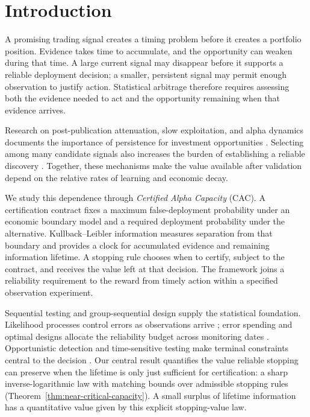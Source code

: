 \documentclass[11pt]{article}
\numberwithin{equation}{section}
\theoremstyle{plain}
\theoremstyle{definition}
\theoremstyle{remark}
\begin{document}
\vspace{0.45em}

\section{Introduction}\label{introduction}

A promising trading signal creates a timing problem before it creates a portfolio position. Evidence takes time to accumulate, and the opportunity can weaken during that time. A large current signal may disappear before it supports a reliable deployment decision; a smaller, persistent signal may permit enough observation to justify action. Statistical arbitrage therefore requires assessing both the evidence needed to act and the opportunity remaining when that evidence arrives.

Research on post-publication attenuation, slow exploitation, and alpha dynamics documents the importance of persistence for investment opportunities \cite{mcleanpontiff2016,jacobsmuller2020,kaplanski2023,penasse2022}. Selecting among many candidate signals also increases the burden of establishing a reliable discovery \cite{harveyliu2016,baileyloprado2014,baileyborwein2017}. Together, these mechanisms make the value available after validation depend on the relative rates of learning and economic decay.

We study this dependence through \emph{Certified Alpha Capacity} (CAC). A certification contract fixes a maximum false-deployment probability under an economic boundary model and a required deployment probability under the alternative. Kullback--Leibler information measures separation from that boundary and provides a clock for accumulated evidence and remaining information lifetime. A stopping rule chooses when to certify, subject to the contract, and receives the value left at that decision. The framework joins a reliability requirement to the reward from timely action within a specified observation experiment.

Sequential testing and group-sequential design supply the statistical foundation. Likelihood processes control errors as observations arrive \cite{wald1947,siegmund1985}; error spending and optimal designs allocate the reliability budget across monitoring dates \cite{obrienfleming1979,landemets1983,ealesjennison1992,barberjennison2002}. Opportunistic detection and time-sensitive testing make terminal constraints central to the decision \cite{zhangmoustakidespoor2016,clericoetal2026,hamjasinzhao2026}. Our central result quantifies the value reliable stopping can preserve when the lifetime is only just sufficient for certification: a sharp inverse-logarithmic law with matching bounds over admissible stopping rules (Theorem~\ref{thm:near-critical-capacity}). A small surplus of lifetime information has a quantitative value given by this explicit stopping-value law.
\end{document}
